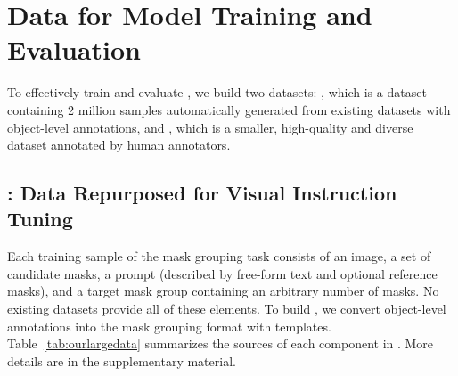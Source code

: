 \section{Data for Model Training and Evaluation}
\label{sec:data}

To effectively train and evaluate \ourmodel, we build two datasets: \ourlargedata, which is a dataset containing 2 million samples automatically generated from existing datasets with object-level annotations, and \ourgooddata, which is a smaller, high-quality and diverse dataset annotated by human annotators.

\subsection{\ourlargedata: Data Repurposed for Visual Instruction Tuning}
Each training sample of the mask grouping task consists of an image, a set of candidate masks, a prompt (described by free-form text and optional reference masks), and a target mask group containing an arbitrary number of masks. No existing datasets provide all of these elements. To build \ourlargedata, we convert object-level annotations into the mask grouping format with templates. Table~\ref{tab:ourlargedata} summarizes the sources of each component in \ourlargedata. More details are in the supplementary material.

{
\setlength{\tabcolsep}{2pt}
\begin{table}[th]
    \centering
    \caption{\textbf{Composition of \ourlargedata.} We collect mask groups based on categories, attributes, positions, and other free-form descriptions by converting object-level annotations from MS-COCO~\cite{lin2014microsoft}, LVIS~\cite{gupta2019lvis}, Visual Genome~\cite{krishna2017visual}, and (generalized) referring expression segmentation datasets~\cite{yu2016modeling, liu2023gres}.}
    \label{tab:ourlargedata}
\end{table}
}

